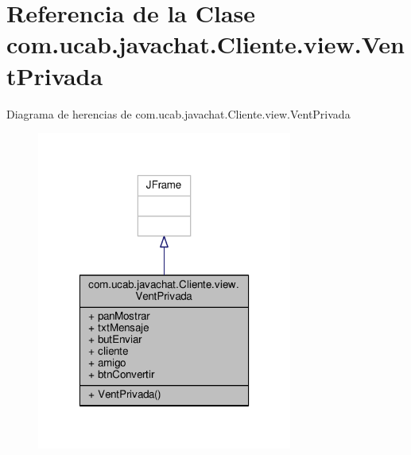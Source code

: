 \hypertarget{classcom_1_1ucab_1_1javachat_1_1_cliente_1_1view_1_1_vent_privada}{\section{Referencia de la Clase com.\-ucab.\-javachat.\-Cliente.\-view.\-Vent\-Privada}
\label{classcom_1_1ucab_1_1javachat_1_1_cliente_1_1view_1_1_vent_privada}
}


Diagrama de herencias de com.\-ucab.\-javachat.\-Cliente.\-view.\-Vent\-Privada
\nopagebreak
\begin{figure}[H]
\begin{center}
\leavevmode
\includegraphics[width=238pt]{d8/d22/classcom_1_1ucab_1_1javachat_1_1_cliente_1_1view_1_1_vent_privada__inherit__graph}
\end{center}
\end{figure}


